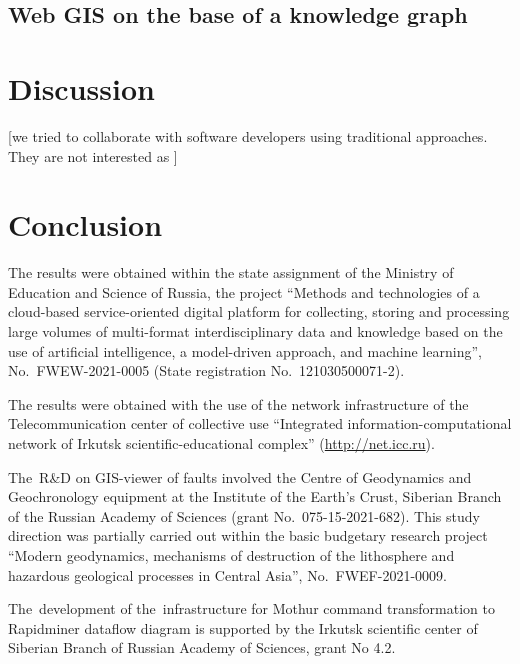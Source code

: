 \documentclass[
]{ceurart}
\begin{document}
\subsection{Web GIS on the base of a knowledge graph}
\label{sec:gis-impl}


\section{Discussion}
\label{sec:disc}


[we tried to collaborate with software developers using traditional approaches. They are not interested as ]

\section*{Conclusion}

\begin{acknowledgments}

The results were obtained within the state assignment of the Ministry of Education and Science of Russia, the project ``Methods and technologies of a cloud-based service-oriented digital platform for collecting, storing and processing large volumes of multi-format interdisciplinary data and knowledge based on the use of artificial intelligence, a model-driven approach, and machine learning'', No.~FWEW-2021-0005 (State registration No.~121030500071-2).

The results were obtained with the use of the network infrastructure of the Telecommunication center of collective use ``Integrated information-computational network of Irkutsk scientific-educational complex'' (\url{http://net.icc.ru}).

The~R\&D on GIS-viewer of faults involved the Centre of Geodynamics and Geochronology equipment at the Institute of the Earth's Crust, Siberian Branch of the Russian Academy of Sciences (grant No.~075-15-2021-682).   This study direction was partially carried out within the basic budgetary research project ``Modern geodynamics, mechanisms of destruction of the lithosphere and hazardous geological processes in Central Asia'', No.~FWEF-2021-0009.

The~development of the~infrastructure for Mothur command transformation to Rapidminer dataflow diagram is supported by the Irkutsk scientific center of Siberian Branch of Russian Academy of Sciences, grant No 4.2.

\end{acknowledgments}
% 
\end{document}
